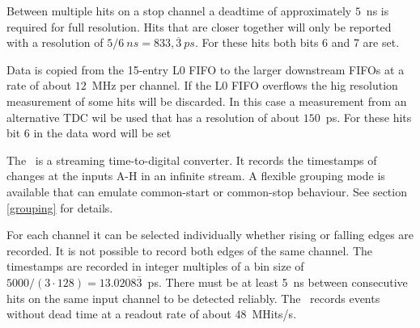 {    Between multiple hits on a stop channel a deadtime of approximately $5$~ns is required for full resolution. 
    Hits that are closer together will only be reported with a resolution of $5/6~ns = 833,\overline{3}~ps$. For these hits both bits 6 and 7 are set.

    Data is copied from the 15-entry L0 FIFO to the larger downstream FIFOs at a rate of about $12$~MHz per channel. 
    If the L0 FIFO overflows the hig resolution measurement of some hits will be discarded. 
    In this case a measurement from an alternative TDC wil be used that has a resolution of about $150$~ps. 
    For these hits bit 6 in the data word will be set
} { %
    The \deviceName\ is a streaming time-to-digital converter. It records the timestamps of changes at the inputs A-H in an infinite stream. 
    A flexible grouping mode is available that can emulate common-start or common-stop behaviour. See section \ref{grouping} for details.

    For each channel it can be selected individually whether rising or falling edges are recorded. It is not possible to record both edges of the same channel. 
    The timestamps are recorded in integer multiples of a bin size of $5000/(3\cdot 128) = 13.0208\overline{3}$~ps. 
    There must be at least 5~ns between consecutive hits on the same input channel to be detected reliably. 
    The \deviceName\ records events without dead time at a readout rate of about $48$~MHits/s.
}